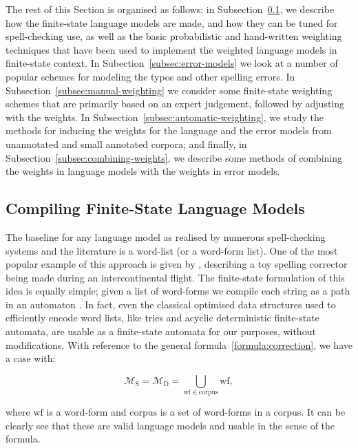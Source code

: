 \documentclass[a4paper,12pt]{article}
\begin{document}
The rest of this Section is organised as follows: in
Subsection~\ref{subsec:language-models}, we describe how the finite-state
language models are made, and how they can be tuned for spell-checking use, as
well as the basic probabilistic and hand-written weighting techniques that have
been used to implement the weighted language models in finite-state context.  In
Subection~\ref{subsec:error-models} we look at a number of popular schemes for
modeling the typos and other spelling errors.  In
Subsection~\ref{subsec:manual-weighting} we consider some finite-state weighting
schemes that are primarily based on an expert judgement, followed by adjusting
with the weights.  In Subsection~\ref{subsec:automatic-weighting}, we study the
methods for inducing the weights for the language and the error models from
unannotated and small annotated corpora; and finally, in
Subsection~\ref{subsec:combining-weights}, we describe some methods of combining
the weights in language models with the weights in error models.

\subsection{Compiling Finite-State Language Models}
\label{subsec:language-models}

The baseline for any language model as realised by numerous spell-checking
systems and the literature is a word-list (or a word-form list). One of the
most popular example of this approach is given by \cite{norvig/2010},
describing a toy spelling corrector being made during an intercontinental
flight. The finite-state formulation of this idea is equally simple; given a
list of word-forms we compile each string as a path in an automaton
\cite[]{pirinen2012effects}. In fact, even the classical optimised data
structures used to efficiently encode word lists, like tries and acyclic
deterministic finite-state automata, are usable as a finite-state automata for
our purposes, without modifications. With reference to the general
formula~\ref{formula:correction}, we have a case with:

\begin{equation}
    \mathcal{M}_\mathrm{S} = \mathcal{M}_\mathrm{D} = \bigcup_{\mathrm{wf} \in \mathrm{corpus}} \mathrm{wf},
\end{equation}

where $\mathrm{wf}$ is a word-form and $\mathrm{corpus}$ is a set of word-forms
in a corpus. It can be clearly see that these are valid language models and
usable in the sense of the formula.
\end{document}

